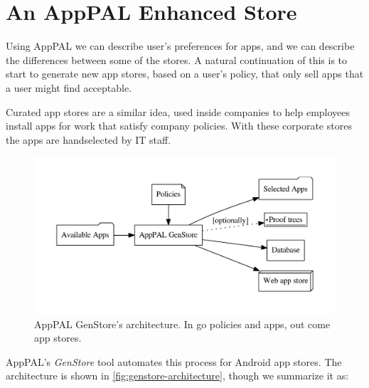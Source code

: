 \documentclass[thesis.tex]{subfiles}
\begin{document}
\section{An AppPAL Enhanced Store}

Using AppPAL we can describe user's preferences for apps, and we can describe
the differences between some of the stores.  A natural continuation of this is
to start to generate new app stores, based on a user's policy, that only sell
apps that a user might find acceptable.

Curated app stores are a similar idea, used inside companies to help employees
install apps for work that satisfy company policies.  With these corporate stores the apps are handselected
by IT staff.  

\begin{figure}\centering
  \includegraphics[width=\textwidth]{figures/genstore.pdf}
  \caption[AppPAL GenStore's architecture.]{AppPAL GenStore's architecture.  In go policies and apps, out come app stores.}
  \label{fig:genstore-architecture}
\end{figure}

AppPAL's \emph{GenStore} tool automates this process for Android app stores.  The architecture is shown in \autoref{fig:genstore-architecture}, though we summarize it as:
\end{document}
